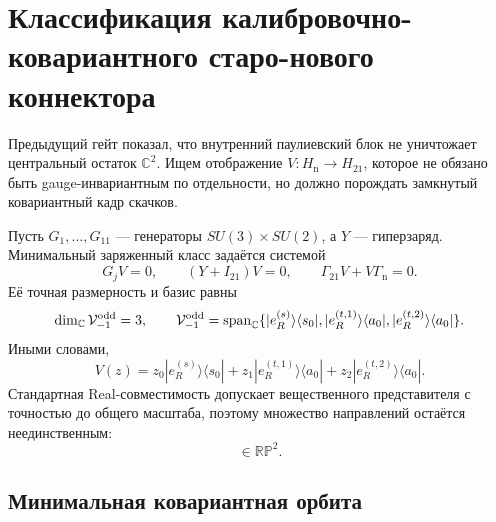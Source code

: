 \chapter{Классификация калибровочно-ковариантного старо-нового коннектора}
\label{ch:v8-baryon-c0-old-new-gauge-covariant-connector-classification-gate}

Предыдущий гейт показал, что внутренний паулиевский блок не уничтожает
центральный остаток $\mathbb C^2$. Ищем отображение
$V:H_{\mathrm n}\to H_{21}$, которое не обязано быть gauge-инвариантным
по отдельности, но должно порождать замкнутый ковариантный кадр скачков.

Пусть $G_1,\ldots,G_{11}$ --- генераторы $SU(3)\times SU(2)$, а $Y$ ---
гиперзаряд. Минимальный заряженный класс задаётся системой
\begin{equation}
 G_jV=0,
 \qquad (Y+I_{21})V=0,
 \qquad \Gamma_{21}V+V\Gamma_{\mathrm n}=0.
 \label{eq:v8-baryon-c0-old-new-covariant-map-system}
\end{equation}
Её точная размерность и базис равны
\begin{equation}
 \dim_{\mathbb C}\mathcal V_{-1}^{\rm odd}=3,
 \qquad
 \mathcal V_{-1}^{\rm odd}
 =\operatorname{span}_{\mathbb C}
 \{|e_R^{(s)}\rangle\langle s_0|,
 |e_R^{(t,1)}\rangle\langle a_0|,
 |e_R^{(t,2)}\rangle\langle a_0|\}.
 \label{eq:v8-baryon-c0-old-new-covariant-map-basis}
\end{equation}
Иными словами,
\begin{equation}
 V(z)=z_0|e_R^{(s)}\rangle\langle s_0|
 +z_1|e_R^{(t,1)}\rangle\langle a_0|
 +z_2|e_R^{(t,2)}\rangle\langle a_0|.
 \label{eq:v8-baryon-c0-old-new-general-connector}
\end{equation}
Стандартная Real-совместимость допускает вещественного представителя с
точностью до общего масштаба, поэтому множество направлений остаётся
неединственным:
\begin{equation}
 [z_0:z_1:z_2]\in\mathbb{RP}^2.
 \label{eq:v8-baryon-c0-old-new-real-projective-family}
\end{equation}

\section{Минимальная ковариантная орбита}

